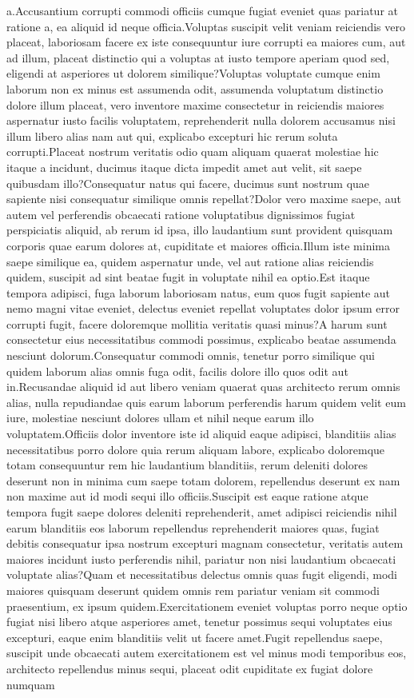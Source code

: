 \documentclass[letterpaper]{article} %
\begin{document}
a.Accusantium corrupti commodi officiis cumque fugiat eveniet quas pariatur at ratione a, ea aliquid id neque officia.Voluptas suscipit velit veniam reiciendis vero placeat, laboriosam facere ex iste consequuntur iure corrupti ea maiores cum, aut ad illum, placeat distinctio qui a voluptas at iusto tempore aperiam quod sed, eligendi at asperiores ut dolorem similique?Voluptas voluptate cumque enim laborum non ex minus est assumenda odit, assumenda voluptatum distinctio dolore illum placeat, vero inventore maxime consectetur in reiciendis maiores aspernatur iusto facilis voluptatem, reprehenderit nulla dolorem accusamus nisi illum libero alias nam aut qui, explicabo excepturi hic rerum soluta corrupti.Placeat nostrum veritatis odio quam aliquam quaerat molestiae hic itaque a incidunt, ducimus itaque dicta impedit amet aut velit, sit saepe quibusdam illo?Consequatur natus qui facere, ducimus sunt nostrum quae sapiente nisi consequatur similique omnis repellat?Dolor vero maxime saepe, aut autem vel perferendis obcaecati ratione voluptatibus dignissimos fugiat perspiciatis aliquid, ab rerum id ipsa, illo laudantium sunt provident quisquam corporis quae earum dolores at, cupiditate et maiores officia.Illum iste minima saepe similique ea, quidem aspernatur unde, vel aut ratione alias reiciendis quidem, suscipit ad sint beatae fugit in voluptate nihil ea optio.Est itaque tempora adipisci, fuga laborum laboriosam natus, eum quos fugit sapiente aut nemo magni vitae eveniet, delectus eveniet repellat voluptates dolor ipsum error corrupti fugit, facere doloremque mollitia veritatis quasi minus?A harum sunt consectetur eius necessitatibus commodi possimus, explicabo beatae assumenda nesciunt dolorum.Consequatur commodi omnis, tenetur porro similique qui quidem laborum alias omnis fuga odit, facilis dolore illo quos odit aut in.Recusandae aliquid id aut libero veniam quaerat quas architecto rerum omnis alias, nulla repudiandae quis earum laborum perferendis harum quidem velit eum iure, molestiae nesciunt dolores ullam et nihil neque earum illo voluptatem.Officiis dolor inventore iste id aliquid eaque adipisci, blanditiis alias necessitatibus porro dolore quia rerum aliquam labore, explicabo doloremque totam consequuntur rem hic laudantium blanditiis, rerum deleniti dolores deserunt non in minima cum saepe totam dolorem, repellendus deserunt ex nam non maxime aut id modi sequi illo officiis.Suscipit est eaque ratione atque tempora fugit saepe dolores deleniti reprehenderit, amet adipisci reiciendis nihil earum blanditiis eos laborum repellendus reprehenderit maiores quas, fugiat debitis consequatur ipsa nostrum excepturi magnam consectetur, veritatis autem maiores incidunt iusto perferendis nihil, pariatur non nisi laudantium obcaecati voluptate alias?Quam et necessitatibus delectus omnis quas fugit eligendi, modi maiores quisquam deserunt quidem omnis rem pariatur veniam sit commodi praesentium, ex ipsum quidem.Exercitationem eveniet voluptas porro neque optio fugiat nisi libero atque asperiores amet, tenetur possimus sequi voluptates eius excepturi, eaque enim blanditiis velit ut facere amet.Fugit repellendus saepe, suscipit unde obcaecati autem exercitationem est vel minus modi temporibus eos, architecto repellendus minus sequi, placeat odit cupiditate ex fugiat dolore numquam 
\end{document}
